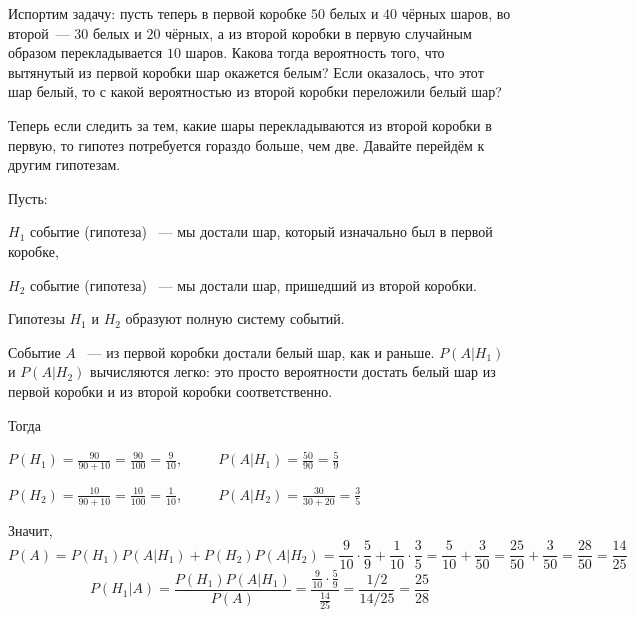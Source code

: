 \documentclass[11pt]{article}
\begin{document}
\begin{example}
    Испортим задачу: пусть теперь в первой коробке $50$ белых и $40$ чёрных шаров,
    во второй~--- $30$ белых и $20$ чёрных, а из второй коробки в первую случайным
    образом перекладывается $10$ шаров. Какова тогда вероятность того, что вытянутый
    из первой коробки шар окажется белым? Если оказалось, что этот шар белый, то с
    какой вероятностью из второй коробки переложили белый шар?

    Теперь если следить за тем, какие шары перекладываются из второй коробки в первую,
    то гипотез потребуется гораздо больше, чем две. Давайте перейдём к другим гипотезам.

    Пусть:
    
    \nopagebreak
    $H_1$ событие (гипотеза) ~--- мы достали шар, который изначально был в первой
    коробке,
    
    \nopagebreak
    $H_2$ событие (гипотеза) ~--- мы достали шар, пришедший из второй коробки.
    
    Гипотезы $H_1$ и $H_2$ образуют полную систему событий.
    
    Событие $A$ ~--- из первой коробки достали белый шар, как и раньше. $P(A \vert H_1)$
    и $P(A \vert H_2)$ вычисляются легко: это просто вероятности достать белый шар из
    первой коробки и из второй коробки соответственно.
    
    Тогда
	
    \nopagebreak
    \vspace{0.2em}

    \nopagebreak
    $P(H_1)=\frac{90}{90+10}=\frac{90}{100}=\frac{9}{10}$,
    ~~~~ $P(A \vert H_1)=\frac{50}{90}=\frac{5}{9}$

    \nopagebreak
    \vspace{0.2em}

    \nopagebreak
    $P(H_2)=\frac{10}{90+10}=\frac{10}{100}=\frac{1}{10}$,
    ~~~~ $P(A \vert H_2)=\frac{30}{30+20}=\frac{3}{5}$

    \vspace{0.2em}

    Значит,
    $$
        P(A)=P(H_1)P(A \vert H_1)+P(H_2)P(A \vert H_2)
        =\frac{9}{10}\cdot\frac{5}{9}+\frac{1}{10}\cdot\frac{3}{5}
        =\frac{5}{10}+\frac{3}{50}=\frac{25}{50}+\frac{3}{50}=\frac{28}{50}
        =\frac{14}{25}
    $$
    $$
        P(H_1 \vert A)
        =\frac{P(H_1)P(A \vert H_1)}{P(A)}
        =\frac{\frac{9}{10}\cdot\frac{5}{9}}{\frac{14}{25}}
        =\frac{1/2}{14/25}=\frac{25}{28}
    $$
\end{example}
\end{document}
